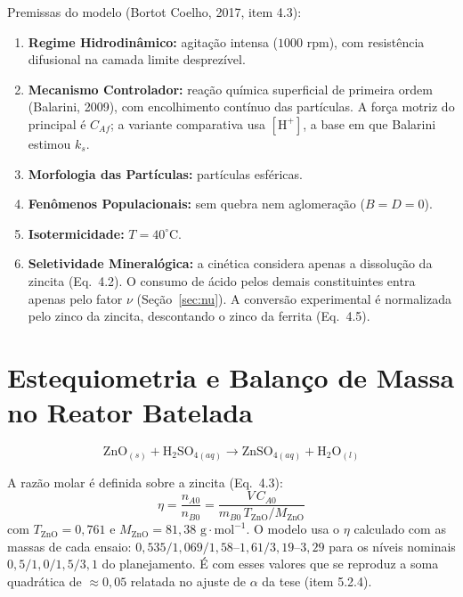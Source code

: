 \documentclass[12pt,a4paper]{article}
\begin{document}
Premissas do modelo (Bortot Coelho, 2017, item 4.3):
\begin{enumerate}
    \item \textbf{Regime Hidrodinâmico:} agitação intensa ($1000\text{ rpm}$), com resistência difusional na camada limite desprezível.
    \item \textbf{Mecanismo Controlador:} reação química superficial de primeira ordem (Balarini, 2009), com encolhimento contínuo das partículas. A força motriz do principal é $C_{Af}$; a variante comparativa usa $[\text{H}^+]$, a base em que Balarini estimou $k_s$.
    \item \textbf{Morfologia das Partículas:} partículas esféricas.
    \item \textbf{Fenômenos Populacionais:} sem quebra nem aglomeração ($B = D = 0$).
    \item \textbf{Isotermicidade:} $T = 40^\circ\text{C}$.
    \item \textbf{Seletividade Mineralógica:} a cinética considera apenas a dissolução da zincita (Eq.~4.2). O consumo de ácido pelos demais constituintes entra apenas pelo fator $\nu$ (Seção~\ref{sec:nu}). A conversão experimental é normalizada pelo zinco da zincita, descontando o zinco da ferrita (Eq.~4.5).
\end{enumerate}

\section{Estequiometria e Balanço de Massa no Reator Batelada}

\begin{equation}
    \text{ZnO}_{(s)} + \text{H}_2\text{SO}_{4(aq)} \longrightarrow \text{ZnSO}_{4(aq)} + \text{H}_2\text{O}_{(l)}
\end{equation}

A razão molar é definida sobre a zincita (Eq.~4.3):
\begin{equation}
    \eta = \frac{n_{A0}}{n_{B0}} = \frac{V \, C_{A0}}{m_{B0} \, T_{\text{ZnO}} / M_{\text{ZnO}}}
\end{equation}
com $T_{\text{ZnO}} = 0{,}761$ e $M_{\text{ZnO}} = 81{,}38\text{ g}\cdot\text{mol}^{-1}$. O modelo usa o $\eta$ calculado com as massas de cada ensaio: $0{,}535 / 1{,}069 / 1{,}58$--$1{,}61 / 3{,}19$--$3{,}29$ para os níveis nominais $0{,}5 / 1{,}0 / 1{,}5 / 3{,}1$ do planejamento. É com esses valores que se reproduz a soma quadrática de $\approx 0{,}05$ relatada no ajuste de $\alpha$ da tese (item 5.2.4).
\end{document}
